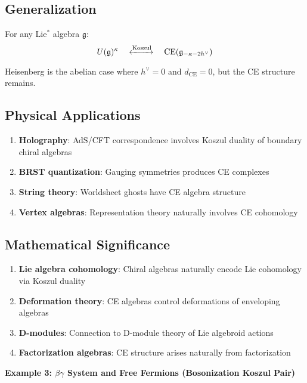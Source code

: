 \begin{example}
\subsection{Generalization}

For any Lie$^*$ algebra $\mathfrak{g}$:
$$U(\mathfrak{g})^\kappa \quad \xleftrightarrow{\text{Koszul}} \quad \text{CE}(\mathfrak{g}_{-\kappa-2h^\vee})$$

Heisenberg is the abelian case where $h^\vee = 0$ and $d_{\text{CE}} = 0$, but the CE structure remains.

\subsection{Physical Applications}

\begin{enumerate}
\item \textbf{Holography}: AdS/CFT correspondence involves Koszul duality of boundary chiral algebras
\item \textbf{BRST quantization}: Gauging symmetries produces CE complexes
\item \textbf{String theory}: Worldsheet ghosts have CE algebra structure
\item \textbf{Vertex algebras}: Representation theory naturally involves CE cohomology
\end{enumerate}

\subsection{Mathematical Significance}

\begin{enumerate}
\item \textbf{Lie algebra cohomology}: Chiral algebras naturally encode Lie cohomology via Koszul duality
\item \textbf{Deformation theory}: CE algebras control deformations of enveloping algebras
\item \textbf{D-modules}: Connection to D-module theory of Lie algebroid actions
\item \textbf{Factorization algebras}: CE structure arises naturally from factorization
\end{enumerate}


\textbf{Example 3: $\beta\gamma$ System and Free Fermions (Bosonization Koszul Pair)}
\label{ex:betagamma-fermion-koszul-intro}


\end{example}

